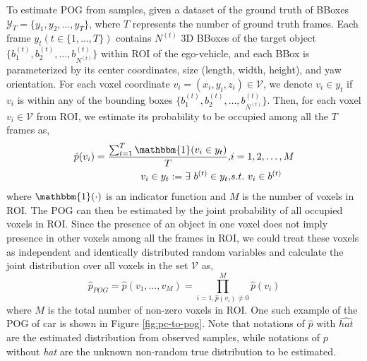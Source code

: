 \documentclass[10pt,twocolumn,letterpaper]{article}
\begin{document}
To estimate POG from samples, given a dataset of the ground truth of BBoxes $\mathcal{Y}_{T}=\{y_1, y_2,\dots, y_T\}$, where $T$ represents the number of ground truth frames. Each frame $y_t (t\in\{1,...,T\})$ contains $N^{(t)}$ 3D BBoxes of the target object $\{b^{(t)}_1, b^{(t)}_2, \dots, b^{(t)}_{N^{(t)}}\}$ within ROI of the ego-vehicle, and each BBox is parameterized by its center coordinates, size (length, width, height), and yaw orientation. For each voxel coordinate $v_i=(x_i, y_i, z_i) \in \mathcal{V}$, we denote $v_i \in y_t$ if $v_i$ is within any of the bounding boxes $\{b^{(t)}_1, b^{(t)}_2, \dots, b^{(t)}_{N^{(t)}}\}$. Then, for each voxel $v_i \in \mathcal{V}$ from ROI, we estimate its probability to be occupied among all the $T$ frames as,
\begin{align}
\label{prob-equation}
\hat{p}(v_i) = \frac{ \sum_{t=1}^T \mathbbm{1}(v_i \in y_t) }{T},& i = 1,2, \dots, M \\
v_i \in y_t := \exists ~ b^{(t)} \in y_t, & s.t. ~ v_i \in b^{(t)}
\end{align}
where $\mathbbm{1}(\cdot)$ is an indicator function and $M$ is the number of voxels in ROI. The POG can then be estimated by the joint probability of all occupied voxels in ROI. Since the presence of an object in one voxel does not imply presence in other voxels among all the frames in ROI, we could treat these voxels as independent and identically distributed random variables and calculate the joint distribution over all voxels in the set $\mathcal{V}$ as,
\begin{equation}
\label{all_pog_est}
\hat p_{POG} = \hat p(v_1,\dots,v_M) = \prod_{i=1, \hat p(v_i)\neq 0}^{M} \hat p(v_i)
\end{equation}
where $M$ is the total number of non-zero voxels in ROI. One such example of the POG of car is shown in Figure \ref{fig:pc-to-pog}. Note that notations of $\hat p$ with $\hat{hat}$ are the estimated distribution from observed samples, while notations of $ p$ without \textit{hat}  are  the unknown non-random true distribution to be estimated.


\end{document}
